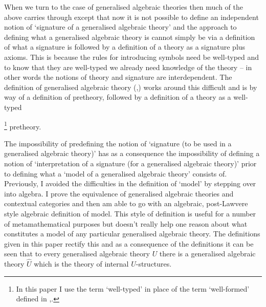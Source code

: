 \note
When we turn to the case of generalised algebraic theories then much of the above carries through except that now 
it is not possible to define an independent notion of `signature of a generalised algebraic theory' and
the approach to defining what a generalised algebraic theory is cannot simply be via a definition of what a signature is followed by a definition 
of a theory  as a signature plus axioms. This is because the rules for introducing symbols need be well-typed and to know that
they are well-typed we already need knowledge of the theory -- in other words the notions of theory and signature are interdependent. 
The  definition of generalised algebraic theory (\cite{Cartmell78},\cite{Cartmell86})  works around this difficult and is by way of 
a definition of pretheory, 
followed by a definition of a theory as a well-typed{\footnote{In this paper I use the term `well-typed' in place of the term `well-formed' defined in \cite{Cartmell78},\cite{Cartmell86}.} pretheory. 

\note The impossibility of predefining the notion of `signature (to be used in a generalised algebraic theory)' has as a consequence
the impossibility of defining a notion of `interpretation of a signature (for a generalised algebraic theory)' prior to 
defining what a `model of a generalised algebraic theory' consists of.  Previously, I avoided the difficulties
in the definition of `model' by stepping over into algebra.
I prove the equivalence of generalised algebraic theories and contextual categories and then am able to go with an algebraic, post-Lawvere
style algebraic definition of model. This  style of definition is  useful for a number of metamathematical purposes but  doesn't really
help one reason about what constitutes a model of any particular generalised algebraic theory.  The definitions given in this paper rectify this
and as a consequence of the definitions it can be seen that to every generalised algebraic theory $U$ there is a generalised algebraic theory 
$\hat{U}$ which is the theory of internal $U$-structures.


}
